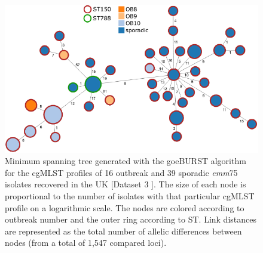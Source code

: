 \newpage
\begin{figure}[!ht]
    \centering
    \includegraphics[angle=0,width=\textwidth]{figures/chapter 4/FigureS12.pdf}
    \caption[Minimum spanning tree generated with the goeBURST algorithm for the cgMLST profiles of 16 outbreak and 39 sporadic \textit{emm}75 isolates recovered in the UK.]{Minimum spanning tree generated with the goeBURST algorithm for the \ac{cgMLST} profiles of 16 outbreak and 39 sporadic \textit{emm}75 isolates recovered in the UK \cite{coelho_genomic_2019} [Dataset 3 \cite{friaes_supplemental_2023}]. The size of each node is proportional to the number of isolates with that particular \ac{cgMLST} profile on a logarithmic scale. The nodes are colored according to outbreak number and the outer ring according to \ac{ST}. Link distances are represented as the total number of allelic differences between nodes (from a total of 1,547 compared loci).}
    \label{fig:chap4_figureS12}
\end{figure}


